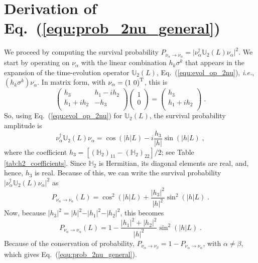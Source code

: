 \documentclass[final,5p,times,twocolumn]{elsarticle}
\newcommand{\ie}{{\it i.e.}}
\newcommand{\eq}{Eq.}
\newcommand{\equ}[1]{\eq~(\ref{equ:#1})}
\begin{document}


\section{Derivation of \equ{prob_2nu_general}}
\label{appendix:derivation_prob_2nu_general}

We proceed by computing the survival probability $P_{\nu_\alpha \to \nu_\alpha} = \lvert \nu_\alpha^\dagger \mathbb{U}_2(L) \nu_\alpha \rvert^2$.  We start by operating on $\nu_\alpha$ with the linear combination $h_k \sigma^k$ that appears in the expansion of the time-evolution operator $\mathbb{U}_2(L)$, \equ{evol_op_2nu}, \ie, $(h_k \sigma^k) \nu_\alpha$.  In matrix form, with $\nu_\alpha = \left(1~0\right)^{\rm T}$, this is
\begin{equation*}
 \left(\begin{array}{cc}
  h_3      & h_1-ih_2 \\
  h_1+ih_2 & -h_3     \\
 \end{array}\right)
 \left(\begin{array}{c}
  1 \\
  0 \\
 \end{array}\right)
 =
 \left(\begin{array}{c}
  h_3      \\
  h_1+ih_2 \\
 \end{array}\right) \;.
\end{equation*}
So, using \equ{evol_op_2nu} for $\mathbb{U}_2(L)$, the survival probability amplitude is
\begin{equation*}
 \nu_\alpha^\dagger \mathbb{U}_2(L) \nu_\alpha
 =
 \cos\left(\left\vert h\right\vert L\right)
 -
 i \frac{h_3}{\lvert h \rvert} \sin\left(\left\vert h\right\vert L\right) \;,
\end{equation*}
where the coefficient $h_3 = [(\mathbb{H}_2)_{11} - (\mathbb{H}_2)_{22}]/2$; see Table \ref{tab:h2_coefficients}.  Since $\mathbb{H}_2$ is Hermitian, its diagonal elements are real, and, hence, $h_3$ is real.  Because of this, we can write the survival probability $\lvert \nu_\alpha^\dagger \mathbb{U}_2(L) \nu_\alpha \rvert^2$ as
\begin{equation*}
 P_{\nu_\alpha \to \nu_\alpha}(L)
 =
 \cos^2(\lvert h \rvert L)
 +
 \frac{\lvert h_3 \rvert^2}{\lvert h \rvert^2} \sin^2(\lvert h \rvert L) \;.
\end{equation*}
Now, because $\vert h_3 \rvert^2 = \vert h \rvert^2 - \vert h_1 \rvert^2 - \vert h_2 \rvert^2$, this becomes
\begin{equation*}
 P_{\nu_\alpha \to \nu_\alpha}(L)
 =
 1
 -
 \frac{\lvert h_1 \rvert^2 + \lvert h_2 \rvert^2}{\lvert h \rvert^2} \sin^2(\lvert h \rvert L) \;.
\end{equation*}
Because of the conservation of probability, $P_{\nu_\alpha \to \nu_\beta} = 1 - P_{\nu_\alpha \to \nu_\alpha}$, with $\alpha \neq \beta$, which gives \equ{prob_2nu_general}.
\end{document}
